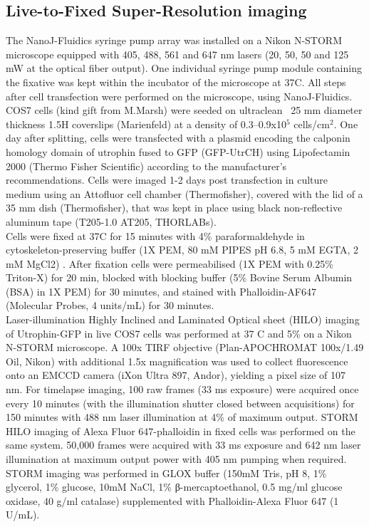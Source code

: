 \subsection*{Live-to-Fixed Super-Resolution imaging}
The NanoJ-Fluidics syringe pump array was installed on a Nikon N-STORM microscope equipped with 405, 488, 561 and 647 nm lasers (20, 50, 50 and 125 mW at the optical fiber output). One individual syringe pump module containing the fixative was kept within the incubator of the microscope at 37\degree C. All steps after cell transfection were performed on the microscope, using NanoJ-Fluidics. COS7 cells (kind gift from M.Marsh) were seeded on ultraclean~\cite{pereira2015high} 25 mm diameter thickness 1.5H coverslips (Marienfeld) at a density of 0.3–0.9x10$^{5}$ cells/cm$^{2}$. One day after splitting, cells were transfected with a plasmid encoding  the calponin homology domain of utrophin fused to GFP (GFP-UtrCH) using Lipofectamin 2000 (Thermo Fisher Scientific) according to the manufacturer’s recommendations. Cells were imaged 1-2 days post transfection in culture medium using an Attofluor cell chamber (Thermofisher), covered with the lid of a 35 mm dish (Thermofisher), that was kept in place using black non-reflective aluminum tape (T205-1.0 AT205, THORLABs).\\ 
Cells were fixed at 37\degree C for 15 minutes with 4\% paraformaldehyde in cytoskeleton-preserving buffer (1X PEM, 80 mM PIPES pH 6.8, 5 mM EGTA, 2 mM MgCl2) \cite{leyton2016pfa}. After fixation cells were permeabilised (1X PEM with 0.25\% Triton-X) for 20 min, blocked with blocking buffer (5\% Bovine Serum Albumin (BSA) in 1X PEM) for 30 minutes, and stained with Phalloidin-AF647 (Molecular Probes, 4 units/mL) for 30 minutes.\\
Laser-illumination Highly Inclined and Laminated Optical sheet (HILO) imaging of Utrophin-GFP in live COS7 cells was performed at 37 \degree C and 5\%  on a Nikon N-STORM microscope. A 100x TIRF objective (Plan-APOCHROMAT 100x/1.49 Oil, Nikon) with additional 1.5x magnification was used to collect fluorescence onto an EMCCD camera (iXon Ultra 897, Andor), yielding a pixel size of 107 nm. For timelapse imaging, 100 raw frames (33 ms exposure) were acquired once every 10 minutes (with the illumination shutter closed between acquisitions) for 150 minutes with 488 nm laser illumination at 4\% of maximum output. STORM HILO imaging of Alexa Fluor 647-phalloidin in fixed cells was performed on the same system. 50,000 frames were acquired with 33 ms exposure and 642 nm laser illumination at maximum output power with 405 nm pumping when required. STORM imaging was performed in GLOX buffer (150mM Tris, pH 8, 1\% glycerol, 1\% glucose, 10mM NaCl, 1\% β-mercaptoethanol, 0.5 mg/ml glucose oxidase, 40 \textmu{}g/ml catalase) supplemented with Phalloidin-Alexa Fluor 647 (1 U/mL).\\

